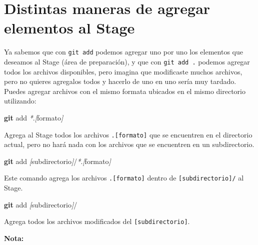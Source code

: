 \documentclass[
]{book}
\newenvironment{Shaded}{\begin{snugshade}}{\end{snugshade}}
\newcommand{\FunctionTok}[1]{\textcolor[rgb]{0.13,0.29,0.53}{\textbf{#1}}}
\newcommand{\NormalTok}[1]{#1}
\newcommand{\PreprocessorTok}[1]{\textcolor[rgb]{0.56,0.35,0.01}{\textit{#1}}}
\newcommand{\SpecialStringTok}[1]{\textcolor[rgb]{0.31,0.60,0.02}{#1}}
\begin{document}
\section{Distintas maneras de agregar elementos al Stage}\label{distintas-maneras-de-agregar-elementos-al-stage}

Ya sabemos que con \texttt{git\ add} podemos agregar uno por uno los elementos que deseamos al Stage (área de preparación), y que con \texttt{git\ add\ .} podemos agregar todos los archivos disponibles, pero imagina que modificaste muchos archivos, pero no quieres agregalos todos y hacerlo de uno en uno sería muy tardado.\\
Puedes agregar archivos con el mismo formata ubicados en el mismo directorio utilizando:

\begin{Shaded}
\begin{Highlighting}[]
\FunctionTok{git}\NormalTok{ add }\PreprocessorTok{*}\NormalTok{.}\PreprocessorTok{[}\SpecialStringTok{formato}\PreprocessorTok{]}
\end{Highlighting}
\end{Shaded}

Agrega al Stage todos los archivos \texttt{.{[}formato{]}} que se encuentren en el directorio actual, pero no hará nada con los archivos que se encuentren en un subdirectorio.

\begin{Shaded}
\begin{Highlighting}[]
\FunctionTok{git}\NormalTok{ add }\PreprocessorTok{[}\SpecialStringTok{subdirectorio}\PreprocessorTok{]}\NormalTok{/}\PreprocessorTok{*}\NormalTok{.}\PreprocessorTok{[}\SpecialStringTok{formato}\PreprocessorTok{]}
\end{Highlighting}
\end{Shaded}

Este comando agrega los archivos \texttt{.{[}formato{]}} dentro de \texttt{{[}subdirectorio{]}/} al Stage.

\begin{Shaded}
\begin{Highlighting}[]
\FunctionTok{git}\NormalTok{ add }\PreprocessorTok{[}\SpecialStringTok{subdirectorio}\PreprocessorTok{]}\NormalTok{/}
\end{Highlighting}
\end{Shaded}

Agrega todos los archivos modificados del \texttt{{[}subdirectorio{]}}.

\textbf{Nota:}
\end{document}
